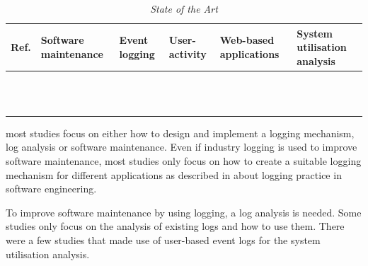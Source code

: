 \begin{table}[!htb]
	\centering
	\caption[State of the Art]
	{\textit{State of the Art}}
	\label{tbl:ch1_StateOfTheART}
	\begin{tabularx}{\linewidth}{|p{}|Y|Y|Y|Y|Y|}
		\hline \textbf{Ref.} & \RaggedRight \textbf{Software maintenance} & \RaggedRight \textbf{Event logging} & \RaggedRight \textbf{User-activity} & \RaggedRight \textbf{Web-based applications} & \textbf{System utilisation analysis} \\
		\hline \RaggedRight \cite{Ackermann2009, Mamone1994, Galster2019, Reimanis2016, Snipes2018, Ogheneovo2014} & \cmark & \xmark & \xmark & \xmark & \xmark \\
		\hline \cite{Tang2010} & \cmark & \cmark & \xmark & \xmark & \xmark \\
		\hline \cite{Port2017} & \cmark & \xmark & \xmark & \xmark & \cmark \\
		\hline \cite{Zhu2015} & \cmark & \cmark & \cmark & \xmark & \xmark \\
		\hline \cite{Cinque2013} & \xmark & \cmark & \xmark & \xmark & \cmark \\
		\hline \cite{Baccanico2014, Zhu2019,Kherbouche2017, Bekeneva2020, Jia2018} & \xmark & \cmark & \xmark & \xmark & \xmark \\
		\hline \cite{Pecchia2015} & \xmark & \cmark & \xmark & \xmark & \cmark \\
		\hline \cite{Slaninova2014, Dhanalakshmi2016, Waqar2017} & \xmark & \xmark & \cmark & \cmark & \cmark \\
		\hline \cite{Hasiloglu2018} & \xmark & \xmark & \xmark & \cmark & \cmark \\
		\hline \cite{Kocsis2012} & \xmark & \xmark & \xmark & \cmark & \cmark \\
		\hline \cite{Rong2020} & \xmark & \cmark & \xmark & \xmark & \cmark \\
		\hline \cite{Wang2008, Paliouras1999} & \xmark & \xmark & \xmark & \cmark & \cmark \\
		\hline
	\end{tabularx}
\end{table}

 most studies focus on either how to design and implement a logging mechanism, log analysis or software maintenance. Even if industry logging is used to improve software maintenance, most studies only focus on how to create a suitable logging mechanism for different applications as described in  about logging practice in software engineering.\par To improve software maintenance by using logging, a log analysis is needed. Some studies only focus on the analysis of existing logs and how to use them. There were a few studies that made use of user-based event logs for the system utilisation analysis.

